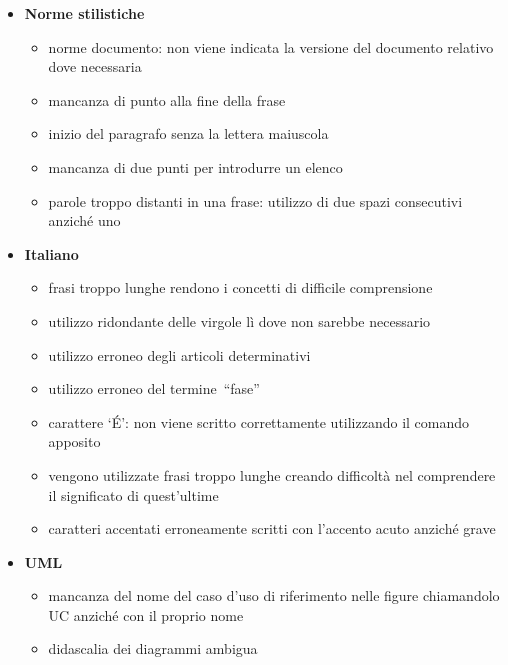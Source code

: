 \begin{itemize}

\item \textbf{Norme stilistiche}

	\begin{itemize}
	
	\item norme documento: non viene indicata la versione del documento relativo dove  necessaria
	\item mancanza di punto alla fine della frase
	\item inizio del paragrafo senza la lettera maiuscola
	\item mancanza di due punti per introdurre un elenco
	\item parole troppo distanti in una frase: utilizzo di due spazi consecutivi anziché uno
	
	\end{itemize}


\item \textbf{Italiano}

	\begin{itemize}

	\item frasi troppo lunghe rendono i concetti di difficile comprensione 
	\item utilizzo ridondante delle virgole lì dove non sarebbe necessario
	\item utilizzo erroneo degli articoli determinativi
	\item utilizzo erroneo del termine “fase”
	\item carattere ‘\'E’: non viene scritto correttamente utilizzando il comando apposito
	\item vengono utilizzate frasi troppo lunghe creando difficoltà nel comprendere il significato di quest’ultime
	\item caratteri accentati erroneamente scritti con l’accento acuto anziché grave
	
	\end{itemize}


\item \textbf{UML}


	\begin{itemize}
	\item mancanza del nome del caso d’uso di riferimento nelle figure chiamandolo UC anziché con il proprio nome
	\item didascalia dei diagrammi ambigua
	\end{itemize}




\end{itemize}
